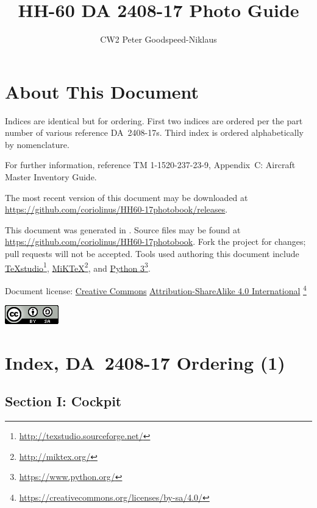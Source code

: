 \documentclass[letterpaper,11pt,openany,oneside]{book}
\author{CW2 Peter Goodspeed-Niklaus}
\title{HH-60 DA 2408-17 Photo Guide}
\begin{document}
\frontmatter
\setcounter{page}{0}
\maketitle
\clearpage
\captionsetup{labelformat=empty}
\chapter*{About This Document}
Indices are identical but for ordering. First two indices are ordered per the part number of various reference DA~2408-17s. Third index is ordered alphabetically by nomenclature.

For further information, reference TM 1-1520-237-23-9, Appendix~C: Aircraft Master Inventory Guide.

The most recent version of this document may be downloaded at \\ \url{https://github.com/coriolinus/HH60-17photobook/releases}.

This document was generated in \LaTeXe. Source files may be found at \url{https://github.com/coriolinus/HH60-17photobook}. Fork the project for changes; pull requests will not be accepted. Tools used authoring this document include \href{http://texstudio.sourceforge.net/}{TeXstudio}\footnote{\url{http://texstudio.sourceforge.net/}}, \href{http://miktex.org/}{MiKTeX}\footnote{\url{http://miktex.org/}}, and \href{https://www.python.org/}{Python 3}\footnote{\url{https://www.python.org/}}.

Document license: \href{https://creativecommons.org/}{Creative Commons} \href{https://creativecommons.org/licenses/by-sa/4.0/}{Attribution-ShareAlike 4.0 International}
\footnote{\url{https://creativecommons.org/licenses/by-sa/4.0/}}

\begin{center}
	\href{https://creativecommons.org/licenses/by-sa/4.0/}{\includegraphics{Images/cc-by-sa.png}}
\end{center}

\mainmatter
\chapter{Index, DA~2408-17 Ordering (1)}
\section{Section I: Cockpit}

\clearpage
\end{document}
